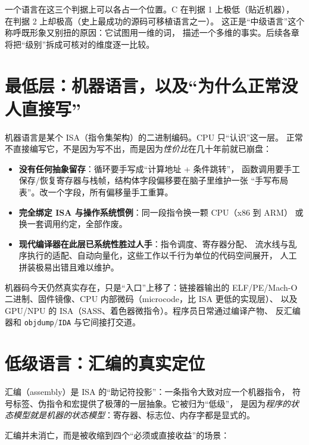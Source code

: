 \documentclass[12pt,a4paper,fontset=fandol]{ctexbook}
\newcommand{\Tp}[1]{\texttt{#1}}
\begin{document}
\begin{note}[title=``级别''不是单值标量]
一个语言在这三个判据上可以各占一个位置。C 在判据 1 上极低（贴近机器），
在判据 2 上却极高（史上最成功的源码可移植语言之一）。
这正是``中级语言''这个称呼既形象又别扭的原因：它试图用一维的词，
描述一个多维的事实。后续各章将把``级别''拆成可核对的维度逐一比较。
\end{note}

\section{最低层：机器语言，以及``为什么正常没人直接写''}

机器语言是某个 ISA（指令集架构）的二进制编码。CPU 只``认识''这一层。
正常不直接编写它，不是因为写不出，而是因为\emph{性价比}在几十年前就已崩盘：

\begin{itemize}
  \item \textbf{没有任何抽象留存}：循环要手写成``计算地址 + 条件跳转''，
        函数调用要手工保存/恢复寄存器与栈帧，结构体字段偏移要在脑子里维护一张
        ``手写布局表''。改一个字段，所有偏移量手工重算。
  \item \textbf{完全绑定 ISA 与操作系统惯例}：同一段指令换一颗 CPU（x86 到 ARM）
        或换一套调用约定，全部作废。
  \item \textbf{现代编译器在此层已系统性胜过人手}：指令调度、寄存器分配、
        流水线与乱序执行的适配、自动向量化，这些工作以千行为单位的代码空间展开，
        人工拼装极易出错且难以维护。
\end{itemize}

机器码今天仍然真实存在，只是``入口''上移了：链接器输出的
ELF/PE/Mach-O 二进制、固件镜像、CPU 内部微码（microcode，比 ISA 更低的实现层）、
以及 GPU/NPU 的 ISA（SASS、着色器微指令）。程序员日常通过编译产物、
反汇编器和 \Tp{objdump}/\allowbreak{}\Tp{IDA} 与它间接打交道。

\section{低级语言：汇编的真实定位}

汇编（assembly）是 ISA 的``助记符投影''：一条指令大致对应一个机器指令，
符号标签、伪指令和宏提供了极薄的一层抽象。它被归为``低级''，
是因为\emph{程序的状态模型就是机器的状态模型}：寄存器、标志位、内存字都是显式的。

汇编并未消亡，而是被收缩到四个``必须或直接收益''的场景：
\end{document}

